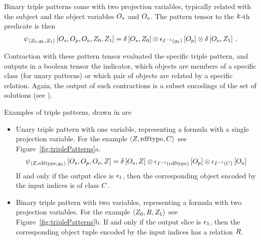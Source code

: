Binary triple patterns come with two projection variables, typically related with the subject and the object variables $O_{s}$ and $O_{o}$.
The pattern tensor to the $k$-th predicate is then
\begin{align*}
    \psi_{\braket{Z_{0},g_{k},Z_{1}}}\left[
        O_{s}, O_{p}, O_{o}, Z_{0}, Z_{1}
    \right]
    = \delta\left[O_{s},Z_{0}\right]
    \otimes \epsilon_{I^{-1}(g_{k})}\left[O_{p}\right]
    \otimes \delta\left[O_{o},Z_{1}\right] \, .
\end{align*}

Contraction with these pattern tensor evaluated the specific triple pattern, and outputs in a boolean tensor the indicator, which objects are members of a specific class (for unary patterns) or which pair of objects are related by a specific relation.
Again, the output of such contractions is a subset encodings of the set of solutions (see ).


Examples of triple patterns, drawn in  are
\begin{itemize}
    \item Unary triple pattern with one variable, representing a formula with a single projection variable.
    For the example $\braket{Z,\mathrm{rdf}\mathrm{type},C}$ see Figure~\ref{fig:triplePatterns}a.
    \begin{align*}
        \psi_{\braket{Z,\mathrm{rdf}\mathrm{type},g_{k}}}\left[
            O_{s}, O_{p}, O_{o}, Z
        \right]
        = \delta\left[O_{s},Z\right]
        \otimes \epsilon_{I^{-1}(\mathrm{rdf}\mathrm{type})}\left[O_{p}\right]
        \otimes \epsilon_{I^{-1}(C)}\left[O_{o}\right]
    \end{align*}
    If and only if the output slice is $\epsilon_1$, then the corresponding object encoded by the input indices is of class $C$.
    \item Binary triple pattern with two variables, representing a formula with two projection variables.
    For the example  $\braket{Z_{0},R,Z_{1}}$ see Figure~\ref{fig:triplePatterns}b.
    If and only if the output slice is $\epsilon_1$, then the corresponding object tuple encoded by the input indices has a relation $R$.
\end{itemize}

